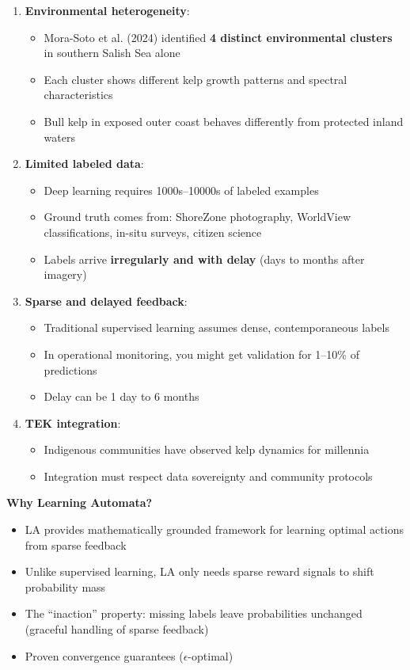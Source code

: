 \documentclass[11pt]{article}
\begin{document}
\begin{enumerate}
    \item \textbf{Environmental heterogeneity}:
    \begin{itemize}
        \item Mora-Soto et al. (2024) identified \textbf{4 distinct environmental clusters} in southern Salish Sea alone
        \item Each cluster shows different kelp growth patterns and spectral characteristics
        \item Bull kelp in exposed outer coast behaves differently from protected inland waters
    \end{itemize}

    \item \textbf{Limited labeled data}:
    \begin{itemize}
        \item Deep learning requires 1000s--10000s of labeled examples
        \item Ground truth comes from: ShoreZone photography, WorldView classifications, in-situ surveys, citizen science
        \item Labels arrive \textbf{irregularly and with delay} (days to months after imagery)
    \end{itemize}

    \item \textbf{Sparse and delayed feedback}:
    \begin{itemize}
        \item Traditional supervised learning assumes dense, contemporaneous labels
        \item In operational monitoring, you might get validation for 1--10\% of predictions
        \item Delay can be 1 day to 6 months
    \end{itemize}

    \item \textbf{TEK integration}:
    \begin{itemize}
        \item Indigenous communities have observed kelp dynamics for millennia
        \item Integration must respect data sovereignty and community protocols
    \end{itemize}
\end{enumerate}

\textbf{Why Learning Automata?}
\begin{itemize}
    \item LA provides mathematically grounded framework for learning optimal actions from sparse feedback
    \item Unlike supervised learning, LA only needs sparse reward signals to shift probability mass
    \item The ``inaction'' property: missing labels leave probabilities unchanged (graceful handling of sparse feedback)
    \item Proven convergence guarantees ($\epsilon$-optimal)
\end{itemize}
\end{document}
